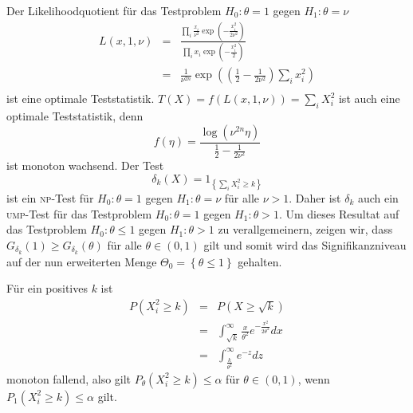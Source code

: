 \solution Der Likelihoodquotient für das Testproblem $H_0: \theta=1$ gegen $H_1 : \theta=\nu$
\begin{eqnarray*}
    L(x,1,\nu) &=& 
    \frac{\prod_i \frac{x_i}{\nu^2} \exp \left( -\frac{x_i^2}{2 \nu^2} \right)}{ \prod_i x_i \exp \left( - \frac{x_i^2}{2} \right)  } \\
    &=& \frac{1}{ \nu^{2n}} \exp\left( \left( \frac{1}{2} -\frac{1}{2 \nu^2} \right) \sum_{i}^{} x_i^2 \right)\\
\end{eqnarray*}
ist eine optimale Teststatistik. $T(X)=f(L(x,1,\nu))= \sum_{i}^{} X_i^2$ 
ist auch eine optimale Teststatistik, denn
\begin{equation*}
    f(\eta) = \frac{ \log \left( \nu^{2n} \eta \right) }{\frac{1}{2} - \frac{1}{2\nu^2}}
\end{equation*}
ist monoton wachsend. Der Test
\begin{equation*}
    \delta_k(X) = 1_{  \left\{ \sum_{i}^{}X_i^2 \geq k \right\} }
\end{equation*}
ist ein \textsc{np}-Test für $H_0: \theta=1$ gegen $H_1 : \theta= \nu$ für alle $\nu>1$.
Daher ist $\delta_k$ auch ein \textsc{ump}-Test für das Testproblem $H_0: \theta=1$ gegen $H_1 : \theta>1$.
Um dieses Resultat auf das Testproblem $H_0: \theta \leq 1$ gegen $H_1 : \theta>1$ zu verallgemeinern, zeigen
wir, dass $G_{\delta_k}(1)\geq G_{\delta_k} (\theta)$ für alle $\theta \in (0,1)$ gilt und somit wird das
Signifikanzniveau auf der nun erweiterten Menge $\Theta_0 = \left\{ \theta\leq 1 \right\}$ gehalten.

Für ein positives $k$ ist 
\begin{eqnarray*}
    P \left( X_i^2 \geq k \right) &=& P \left( X \geq \sqrt{k}  \right) \\
    &=& \int_{\sqrt{k}}^{\infty} \frac{x}{\theta^2} e^{ - \frac{x^2}{ 2 \theta^2}} d x \\
    &=& \int_{\frac{k}{\theta^2}}^{\infty} e^{-z} dz
\end{eqnarray*}
monoton fallend, also gilt $P_\theta \left( X_i^2 \geq k \right) \leq \alpha$ für $\theta\in (0,1)$,
wenn $P_1 \left( X_i^2 \geq k \right)\leq \alpha$ gilt.

